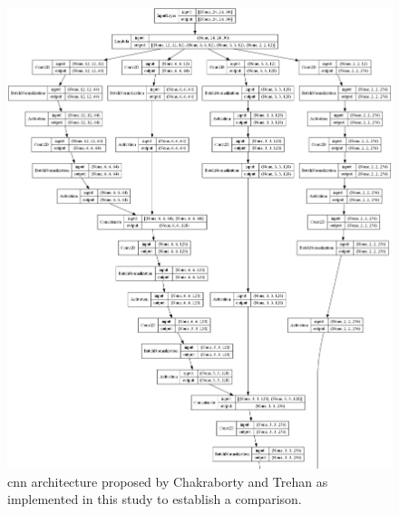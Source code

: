 \begin{figure}[ht]
    \centering
    \includegraphics[width=\linewidth]{figs/vineyard_classification/networks/spectral_net_24x23_64_01.png}
	\caption{\acrshort{cnn} architecture proposed by Chakraborty and Trehan \cite{chakraborty_spectralnet_2021} as implemented in this study to establish a comparison. }
	\label{fig:spectralnet_cnn}
\end{figure}

